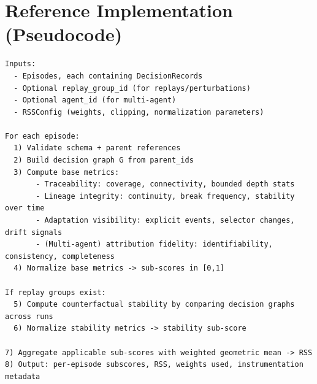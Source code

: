 \section{Reference Implementation (Pseudocode)}
\label{app:pseudocode}

\begin{verbatim}
Inputs:
  - Episodes, each containing DecisionRecords
  - Optional replay_group_id (for replays/perturbations)
  - Optional agent_id (for multi-agent)
  - RSSConfig (weights, clipping, normalization parameters)

For each episode:
  1) Validate schema + parent references
  2) Build decision graph G from parent_ids
  3) Compute base metrics:
       - Traceability: coverage, connectivity, bounded depth stats
       - Lineage integrity: continuity, break frequency, stability over time
       - Adaptation visibility: explicit events, selector changes, drift signals
       - (Multi-agent) attribution fidelity: identifiability, consistency, completeness
  4) Normalize base metrics -> sub-scores in [0,1]

If replay groups exist:
  5) Compute counterfactual stability by comparing decision graphs across runs
  6) Normalize stability metrics -> stability sub-score

7) Aggregate applicable sub-scores with weighted geometric mean -> RSS
8) Output: per-episode subscores, RSS, weights used, instrumentation metadata
\end{verbatim}
